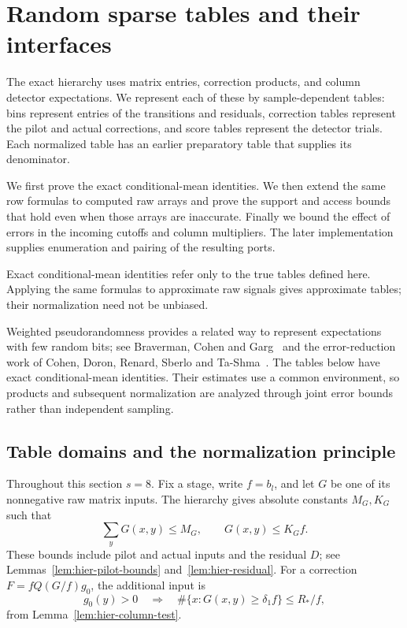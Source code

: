 \section{Random sparse tables and their interfaces}
\label{sec:atom}

The exact hierarchy uses matrix entries, correction products, and column
detector expectations.  We represent each of these by sample-dependent
tables: bins represent entries of the transitions and residuals,
correction tables represent the pilot and actual corrections, and score
tables represent the detector trials.  Each normalized table has an
earlier preparatory table that supplies its denominator.

We first prove the exact conditional-mean identities.  We then extend the
same row formulas to computed raw arrays and prove the support and access
bounds that hold even when those arrays are inaccurate.  Finally we bound
the effect of errors in the incoming cutoffs and column multipliers.  The
later implementation supplies enumeration and pairing of the resulting
ports.

Exact conditional-mean identities refer only to the true tables defined
here.  Applying the same formulas to approximate raw signals gives
approximate tables; their normalization need not be unbiased.

Weighted pseudorandomness provides a related way to represent expectations
with few random bits; see Braverman, Cohen and Garg~\cite{BravermanCohenGarg2020}
and the error-reduction work of Cohen, Doron, Renard, Sberlo and
Ta-Shma~\cite{CohenDoronRenardSberloTaShma2021}. The tables below have
exact conditional-mean identities. Their estimates use a common
environment, so products and subsequent normalization are analyzed
through joint error bounds rather than independent sampling.

\subsection{Table domains and the normalization principle}

Throughout this section $s=8$.  Fix a stage, write $f=b_l$, and let $G$ be
one of its nonnegative raw matrix inputs.  The hierarchy gives absolute
constants $M_G,K_G$ such that
\begin{equation}
 \sum_y G(x,y)\le M_G,\qquad G(x,y)\le K_G f.
 \label{eq:atom-input-bounds}
\end{equation}
These bounds include pilot and actual inputs and the residual $D$; see
Lemmas~\ref{lem:hier-pilot-bounds} and~\ref{lem:hier-residual}.
For a correction $F=fQ(G/f)g_0$, the additional input is
\begin{equation}
 g_0(y)>0\quad\Longrightarrow\quad
 \#\{x:G(x,y)\ge\delta_1 f\}\le R_*/f,
 \label{eq:atom-column-input}
\end{equation}
from Lemma~\ref{lem:hier-column-test}.

